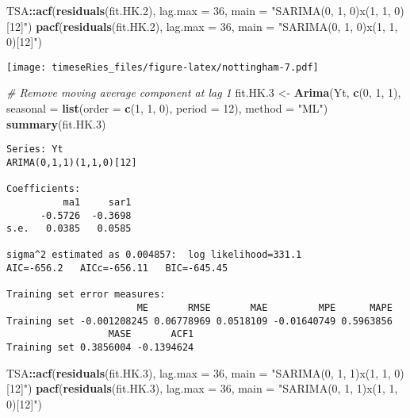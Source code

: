 \documentclass[]{book}
\newenvironment{Shaded}{\begin{snugshade}}{\end{snugshade}}
\newcommand{\CommentTok}[1]{\textcolor[rgb]{0.56,0.35,0.01}{\textit{#1}}}
\newcommand{\DataTypeTok}[1]{\textcolor[rgb]{0.13,0.29,0.53}{#1}}
\newcommand{\DecValTok}[1]{\textcolor[rgb]{0.00,0.00,0.81}{#1}}
\newcommand{\FloatTok}[1]{\textcolor[rgb]{0.00,0.00,0.81}{#1}}
\newcommand{\KeywordTok}[1]{\textcolor[rgb]{0.13,0.29,0.53}{\textbf{#1}}}
\newcommand{\NormalTok}[1]{#1}
\newcommand{\OperatorTok}[1]{\textcolor[rgb]{0.81,0.36,0.00}{\textbf{#1}}}
\newcommand{\StringTok}[1]{\textcolor[rgb]{0.31,0.60,0.02}{#1}}
\begin{document}
\begin{Shaded}
\begin{Highlighting}[]
\NormalTok{TSA}\OperatorTok{::}\KeywordTok{acf}\NormalTok{(}\KeywordTok{residuals}\NormalTok{(fit.HK}\FloatTok{.2}\NormalTok{), }\DataTypeTok{lag.max =} \DecValTok{36}\NormalTok{, }\DataTypeTok{main =} \StringTok{"SARIMA(0, 1, 0)x(1, 1, 0)[12]"}\NormalTok{)}
\KeywordTok{pacf}\NormalTok{(}\KeywordTok{residuals}\NormalTok{(fit.HK}\FloatTok{.2}\NormalTok{), }\DataTypeTok{lag.max =} \DecValTok{36}\NormalTok{, }\DataTypeTok{main =} \StringTok{"SARIMA(0, 1, 0)x(1, 1, 0)[12]"}\NormalTok{)}
\end{Highlighting}
\end{Shaded}

\texttt{[image: timeseRies\_files/figure-latex/nottingham-7.pdf]}

\begin{Shaded}
\begin{Highlighting}[]
\CommentTok{# Remove moving average component at lag 1}
\NormalTok{fit.HK}\FloatTok{.3}\NormalTok{ <-}\StringTok{ }\KeywordTok{Arima}\NormalTok{(Yt, }\KeywordTok{c}\NormalTok{(}\DecValTok{0}\NormalTok{, }\DecValTok{1}\NormalTok{, }\DecValTok{1}\NormalTok{), }\DataTypeTok{seasonal =} \KeywordTok{list}\NormalTok{(}\DataTypeTok{order =} \KeywordTok{c}\NormalTok{(}\DecValTok{1}\NormalTok{, }\DecValTok{1}\NormalTok{, }\DecValTok{0}\NormalTok{), }\DataTypeTok{period =} \DecValTok{12}\NormalTok{), }
    \DataTypeTok{method =} \StringTok{"ML"}\NormalTok{)}
\KeywordTok{summary}\NormalTok{(fit.HK}\FloatTok{.3}\NormalTok{)}
\end{Highlighting}
\end{Shaded}

\begin{verbatim}
Series: Yt 
ARIMA(0,1,1)(1,1,0)[12] 

Coefficients:
          ma1     sar1
      -0.5726  -0.3698
s.e.   0.0385   0.0585

sigma^2 estimated as 0.004857:  log likelihood=331.1
AIC=-656.2   AICc=-656.11   BIC=-645.45

Training set error measures:
                       ME       RMSE       MAE         MPE      MAPE
Training set -0.001208245 0.06778969 0.0518109 -0.01640749 0.5963856
                  MASE       ACF1
Training set 0.3856004 -0.1394624
\end{verbatim}

\begin{Shaded}
\begin{Highlighting}[]
\NormalTok{TSA}\OperatorTok{::}\KeywordTok{acf}\NormalTok{(}\KeywordTok{residuals}\NormalTok{(fit.HK}\FloatTok{.3}\NormalTok{), }\DataTypeTok{lag.max =} \DecValTok{36}\NormalTok{, }\DataTypeTok{main =} \StringTok{"SARIMA(0, 1, 1)x(1, 1, 0)[12]"}\NormalTok{)}
\KeywordTok{pacf}\NormalTok{(}\KeywordTok{residuals}\NormalTok{(fit.HK}\FloatTok{.3}\NormalTok{), }\DataTypeTok{lag.max =} \DecValTok{36}\NormalTok{, }\DataTypeTok{main =} \StringTok{"SARIMA(0, 1, 1)x(1, 1, 0)[12]"}\NormalTok{)}
\end{Highlighting}
\end{Shaded}
\end{document}
